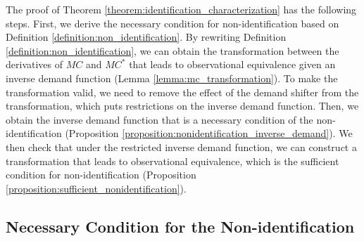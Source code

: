 \documentclass[11pt, a4paper]{article}
\begin{document}
The proof of Theorem \ref{theorem:identification_characterization} has the following steps.
First, we derive the necessary condition for non-identification based on Definition \ref{definition:non_identification}.
By rewriting Definition \ref{definition:non_identification}, we can obtain the transformation between the derivatives of $MC$ and $MC^{*}$ that leads to observational equivalence given an inverse demand function (Lemma \ref{lemma:mc_transformation}).
To make the transformation valid, we need to remove the effect of the demand shifter from the transformation, which puts restrictions on the inverse demand function.
Then, we obtain the inverse demand function that is a necessary condition of the non-identification (Proposition \ref{proposition:nonidentification_inverse_demand}).
We then check that under the restricted inverse demand function, we can construct a transformation that leads to observational equivalence, which is the sufficient condition for non-identification (Proposition \ref{proposition:sufficient_nonidentification}).



\subsection{Necessary Condition for the Non-identification}\label{subsec:necessary_condition_nonidentification}
\end{document}
